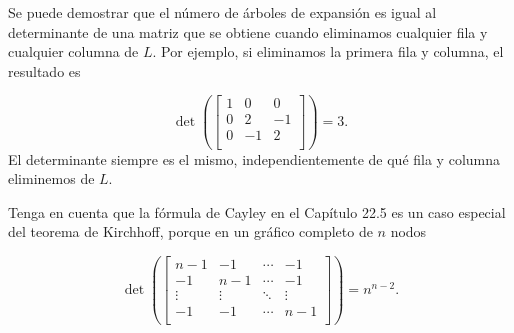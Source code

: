 Se puede demostrar que
el número de árboles de expansión es igual
al determinante de una matriz que se obtiene
cuando eliminamos cualquier fila y cualquier columna de $L$.
Por ejemplo, si eliminamos la primera fila
y columna, el resultado es

\[ \det(
\begin{bmatrix}
  1 & 0 & 0 \\
  0 & 2 & -1 \\
  0 & -1 & 2 \\
 \end{bmatrix}
) =3.\]
El determinante siempre es el mismo,
independientemente de qué fila y columna eliminemos de $L$.

Tenga en cuenta que la fórmula de Cayley en el Capítulo 22.5 es
un caso especial del teorema de Kirchhoff,
porque en un gráfico completo de $n$ nodos

\[ \det(
\begin{bmatrix}
  n-1 & -1 & \cdots & -1 \\
  -1 & n-1 & \cdots & -1 \\
  \vdots & \vdots & \ddots & \vdots \\
  -1 & -1 & \cdots & n-1 \\
 \end{bmatrix}
) =n^{n-2}.\]
